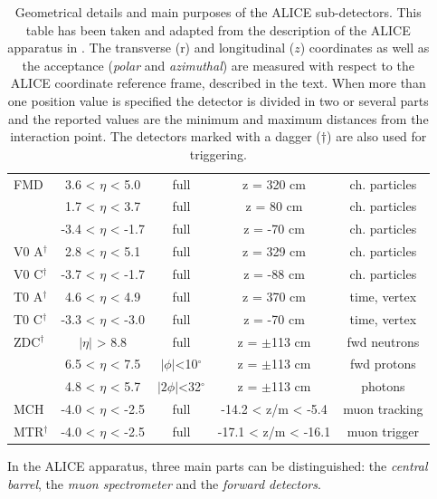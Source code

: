 \begin{table}[!tp]
\begin{tabular*}{\textwidth}{@{\extracolsep{\fill}}lcccc}
    FMD 	                 & 3.6 < $\eta$ < 5.0   & full			& z = 320 cm		& ch. particles\\
			                 & 1.7 < $\eta$ < 3.7	& full			& z = 80 cm		    & ch. particles\\
			                 & -3.4 < $\eta$ < -1.7 & full			& z = -70 cm		& ch. particles\\
	V0 A$^{\dagger}$         & 2.8 < $\eta$ < 5.1	& full			& z = 329 cm		& ch. particles\\
	V0 C$^{\dagger}$         & -3.7 < $\eta$ < -1.7	& full			& z = -88 cm		& ch. particles\\
	T0 A$^{\dagger}$         & 4.6 < $\eta$ < 4.9	& full			& z = 370 cm		& time, vertex\\
	T0 C$^{\dagger}$         & -3.3 < $\eta$ < -3.0	& full			& z = -70 cm		& time, vertex\\
	ZDC$^{\dagger}$		     & $|\eta|$ > 8.8	    & full			& z = $\pm$113 cm	& fwd neutrons\\
			                 & 6.5 < $\eta$ < 7.5	& $|\phi|$<10$^{\circ}$             & z = $\pm$113 cm	&fwd protons\\
			                 & 4.8 < $\eta$ < 5.7	& $|2\phi|$<32$^{\circ}$            & z = $\pm$113 cm   &photons\\
    \midrule
	MCH	                     & -4.0 < $\eta$ < -2.5 & full & -14.2 < z/m < -5.4  & muon tracking \\
	MTR$^{\dagger}$	         & -4.0 < $\eta$ < -2.5 & full & -17.1 < z/m < -16.1 & muon trigger \\	
    \bottomrule
    \end{tabular*}
    \vspace{2pt}
	\caption{Geometrical details and main purposes of the ALICE sub-detectors. This table has been taken and adapted from the description of the ALICE apparatus in \cite{alice:Perf2014}. The transverse (r) and longitudinal ($z$) coordinates as well as the acceptance (\textit{polar} and \textit{azimuthal}) are measured with respect to the ALICE coordinate reference frame, described in the text. When more than one position value is specified the detector is divided in two or several parts and the reported values are the minimum and maximum distances from the interaction point. The detectors marked with a dagger ($\dagger$) are also used for triggering.}
	\label{tab:alice}
\end{table}
\endgroup

In the ALICE apparatus, three main parts can be distinguished: the \textit{central barrel}, the
\textit{muon spectrometer} and the \textit{forward detectors}.

